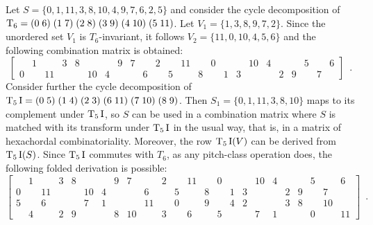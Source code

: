 \begin{example}
    \cite[215]{Starr1984}
    \label{ex:derivation-folded}
    Let $S = \{ 0, 1, 11, 3, 8, 10, 4, 9, 7, 6, 2, 5 \}$ and consider the cycle decomposition of $\operatorname{T}_6 = (0 \; 6) \; (1 \; 7) \; (2 \; 8) \; (3 \; 9) \; (4 \; 10) \; (5 \; 11)$. Let $V_1 = \{ 1, 3, 8, 9, 7, 2 \}$. Since the unordered set $V_1$ is $T_6$-invariant, it follows $V_2 = \{ 11, 0, 10, 4, 5, 6 \}$ and the following combination matrix is obtained:
    \begin{equation}
        \left[
        \begin{array}{cccccccccccc|cccccccccccc}
            & 1 && 3 & 8 &&& 9 & 7 && 2 && 11 && 0 &&& 10 & 4 &&& 5 && 6 \\
            0 && 11 &&& 10 & 4 &&& 6 && 5 && 8 && 1 & 3 &&& 2 & 9 && 7 &  
        \end{array}
        \right] \enspace.
    \end{equation}
    Consider further the cycle decomposition of $\operatorname{T}_5\operatorname{I} = (0 \; 5) \; (1 \; 4) \; (2 \; 3) \; (6 \; 11) \; (7 \; 10) \; (8 \; 9)$. Then $S_1 = \{ 0, 1, 11, 3, 8, 10 \}$ maps to its complement under $\operatorname{T}_5\operatorname{I}$, so $S$ can be used in a combination matrix where $S$ is matched with its transform under $\operatorname{T}_5\operatorname{I}$ in the usual way, that is, in a matrix of hexachordal combinatoriality. Moreover, the row $\operatorname{T}_5\operatorname{I}(V)$ can be derived from $\operatorname{T}_5\operatorname{I}(S)$. Since $\operatorname{T}_5\operatorname{I}$ commutes with $T_6$, as any pitch-class operation does, the following folded derivation is possible:
    \begin{equation}
        \left[
        \begin{array}{cccccccccccc|cccccccccccc}
            & 1 && 3 & 8 &&& 9 & 7 && 2 && 11 && 0 &&& 10 & 4 &&& 5 && 6 \\
            0 && 11 &&& 10 & 4 &&& 6 && 5 && 8 && 1 & 3 &&& 2 & 9 && 7 & \\
            \hline
            5 && 6 &&& 7 & 1 &&& 11 && 0 && 9 && 4 & 2 &&& 3 & 8 && 10 & \\
            & 4 && 2 & 9 &&& 8 & 10 && 3 && 6 && 5 &&& 7 & 1 &&& 0 && 11
        \end{array}
        \right] \enspace.
    \end{equation}
\end{example}

